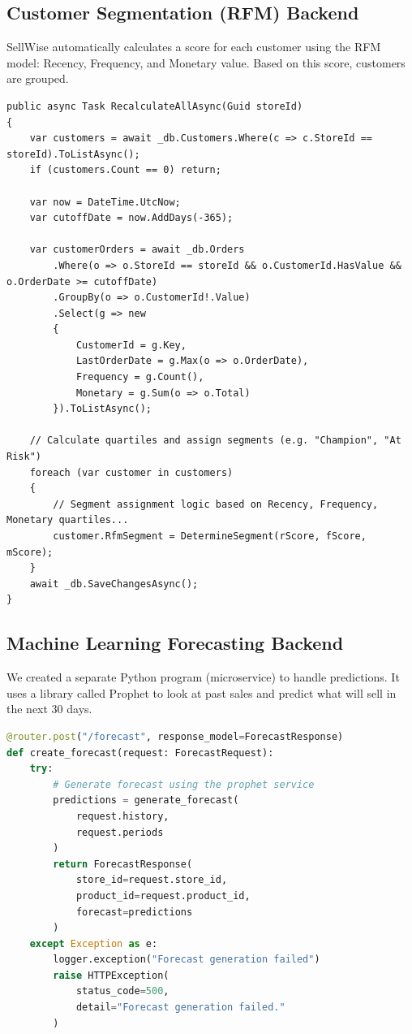 \documentclass[12pt,a4paper]{report}
\begin{document}
\noindent\begin{minipage}{\textwidth}
\subsection{Customer Segmentation (RFM) Backend}
SellWise automatically calculates a score for each customer using the RFM model: Recency, Frequency, and Monetary value. Based on this score, customers are grouped.
\begin{lstlisting}[language={[Sharp]C}]
public async Task RecalculateAllAsync(Guid storeId)
{
    var customers = await _db.Customers.Where(c => c.StoreId == storeId).ToListAsync();
    if (customers.Count == 0) return;

    var now = DateTime.UtcNow;
    var cutoffDate = now.AddDays(-365);

    var customerOrders = await _db.Orders
        .Where(o => o.StoreId == storeId && o.CustomerId.HasValue && o.OrderDate >= cutoffDate)
        .GroupBy(o => o.CustomerId!.Value)
        .Select(g => new
        {
            CustomerId = g.Key,
            LastOrderDate = g.Max(o => o.OrderDate),
            Frequency = g.Count(),
            Monetary = g.Sum(o => o.Total)
        }).ToListAsync();

    // Calculate quartiles and assign segments (e.g. "Champion", "At Risk")
    foreach (var customer in customers)
    {
        // Segment assignment logic based on Recency, Frequency, Monetary quartiles...
        customer.RfmSegment = DetermineSegment(rScore, fScore, mScore);
    }
    await _db.SaveChangesAsync();
}
\end{lstlisting}
\end{minipage}
\vspace{1em}

\noindent\begin{minipage}{\textwidth}
\subsection{Machine Learning Forecasting Backend}
We created a separate Python program (microservice) to handle predictions. It uses a library called Prophet to look at past sales and predict what will sell in the next 30 days.
\begin{lstlisting}[language=python]
@router.post("/forecast", response_model=ForecastResponse)
def create_forecast(request: ForecastRequest):
    try:
        # Generate forecast using the prophet service
        predictions = generate_forecast(
            request.history,
            request.periods
        )
        return ForecastResponse(
            store_id=request.store_id,
            product_id=request.product_id,
            forecast=predictions
        )
    except Exception as e:
        logger.exception("Forecast generation failed")
        raise HTTPException(
            status_code=500,
            detail="Forecast generation failed."
        )
\end{lstlisting}
\end{minipage}
\vspace{1em}
\end{document}
